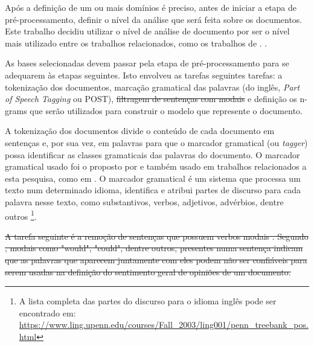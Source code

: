 Após a definição de um ou mais domínios é preciso, antes de iniciar a etapa de pré-processamento, definir o nível da análise que será feita sobre os documentos. Este trabalho decidiu utilizar o nível de análise de documento por ser o nível mais utilizado entre os trabalhos relacionados, como os trabalhos de  \cite{joachims1998text, pang2002thumbs, gamon2004sentiment, mullen2004sentiment, pang2004sentimental, cui2006comparative}. . 

As bases selecionadas devem passar pela etapa de pré-processamento para se adequarem às etapas seguintes. Isto envolveu as tarefas seguintes tarefas:    a tokenização dos documentos, marcação gramatical das palavras (do inglês, \textit{Part of Speech Tagging} ou POST), \sout{filtragem de sentenças com modais} e definição os n-grams que serão utilizados para construir o modelo que represente o documento. 

A tokenização dos documentos divide o conteúdo de cada documento em sentenças e, por sua vez, em palavras para que o marcador gramatical (ou \textit{tagger}) possa identificar as classes gramaticais das palavras do documento. O marcador gramatical usado foi o proposto   por  e também usado em trabalhos relacionados a esta pesquisa, como em \cite{chaovalit2005movie, taboada2008extracting, taboada2011lexicon}. O marcador gramatical é um sistema que processa um texto num determinado idioma, identifica e atribui partes de discurso para cada palavra nesse texto, como substantivos, verbos, adjetivos, advérbios, dentre outros \footnote{A lista completa das partes do discurso para o idioma inglês pode ser encontrado em: \url{https://www.ling.upenn.edu/courses/Fall_2003/ling001/penn_treebank_pos.html}}. 

\sout{A tarefa seguinte é a remoção de sentenças que possuem verbos modais . Segundo , modais como "would", "could", dentre outros, presentes numa sentença indicam que as palavras que aparecem juntamente com eles podem não ser confiáveis para serem usadas na definição do sentimento geral de opiniões de um documento.} 

